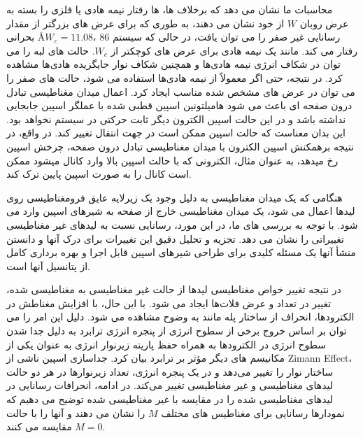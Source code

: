 محاسبات ما نشان می دهد که برخلاف  ها، ها رفتار نیمه هادی یا فلزی را بسته به عرض روبان $W$ از خود نشان می دهند، به طوری که برای عرض های بزرگتر از مقدار بحرانی \AA $W_c = 11.08$، 86 رسانایی غیر صفر را می توان یافت، در حالی که سیستم رفتار می کند. مانند یک نیمه هادی برای عرض های کوچکتر از $W_c$. حالت های لبه را می توان در شکاف انرژی نیمه هادی‌ها و همچنین شکاف نوار جایگزیده هادی‌ها مشاهده کرد. در نتیجه، حتی اگر معمولاً از نیمه هادی‌ها استفاده می شود، حالت های صفر را می توان در عرض های مشخص شده مناسب ایجاد کرد. اعمال میدان مغناطیسی تبادل درون صفحه ای باعث می شود هامیلتونین اسپین قطبی شده با عملگر اسپین  جابجایی نداشته باشد و در این حالت اسپین الکترون دیگر ثابت حرکتی در سیستم نخواهد بود. این بدان معناست که حالت اسپین ممکن است در جهت انتقال تغییر کند. در واقع، در نتیجه برهمکنش اسپین الکترون با میدان مغناطیسی تبادل درون صفحه، چرخش اسپین رخ میدهد، به عنوان مثال، الکترونی که با حالت اسپین بالا وارد کانال میشود ممکن است کانال را به صورت اسپین پایین ترک کند. 

هنگامی که یک میدان مغناطیسی به دلیل وجود یک زیرلایه عایق فرومغناطیسی روی لیدها اعمال می شود، یک میدان مغناطیسی خارج از صفحه به شیرهای اسپین وارد می شود. با توجه به بررسی های ما، در این مورد، رسانایی نسبت به لیدهای غیر مغناطیسی تغییراتی را نشان می دهد. تجزیه و تحلیل دقیق این تغییرات برای درک آنها و دانستن منشأ آنها یک مسئله کلیدی برای طراحی شیرهای اسپین قابل اجرا و بهره برداری کامل از پتانسیل آنها است. 


در نتیجه تغییر خواص مغناطیسی لیدها از حالت غیر مغناطیسی به مغناطیسی شده، تغییر در تعداد و عرض فلات‌ها ایجاد می شود. با این حال، با افزایش مغناطش در الکترودها، انحراف از ساختار پله مانند به وضوح مشاهده می شود. دلیل این امر را می توان بر اساس خروج برخی از سطوح انرژی از پنجره انرژی ترابرد به دلیل جدا شدن سطوح انرژی در الکترودها به همراه حفظ پاریته زیرنوار انرژی به عنوان یکی از مکانیسم های دیگر مؤثر بر ترابرد بیان کرد. جداسازی اسپین ناشی از \gls{Zimann Effect}، ساختار نوار را تغییر می‌دهد و در یک پنجره انرژی، تعداد زیر‌نوارها در هر دو حالت لیدهای مغناطیسی و غیر مغناطیسی تغییر می‌کند. در ادامه، انحرافات رسانایی در لیدهای مغناطیسی شده را در مقایسه با غیر مغناطیسی شده توضیح می دهیم که نمودارها رسانایی برای مغناطیس های مختلف $M$ را نشان می دهند و آنها را با حالت $M = 0$ مقایسه می کنند.

